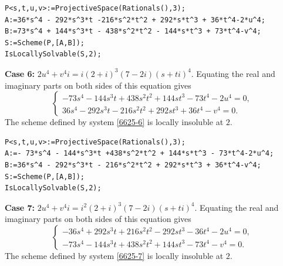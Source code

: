 \documentclass[a4paper,12pt,english,reqno]{amsart}
\begin{document}
\begin{lstlisting}
P<s,t,u,v>:=ProjectiveSpace(Rationals(),3);
A:=36*s^4 - 292*s^3*t -216*s^2*t^2 + 292*s*t^3 + 36*t^4-2*u^4;
B:=73*s^4 + 144*s^3*t - 438*s^2*t^2 - 144*s*t^3 + 73*t^4-v^4;
S:=Scheme(P,[A,B]);
IsLocallySolvable(S,2);
\end{lstlisting}

{\bf Case 6:} $2u^4+v^4i=i(2+i)^3(7-2i)(s+ti)^4$. Equating the real and imaginary parts on both sides of this equation gives
\begin{equation}\label{6625-6}
\begin{cases}
-73s^4 - 144s^3t + 438s^2t^2 + 144st^3 - 73t^4 - 2u^4=0,\\
36s^4 - 292s^3t - 216s^2t^2 + 292st^3 + 36t^4 - v^4=0.
\end{cases}
\end{equation}
The scheme defined by system \eqref{6625-6} is locally insoluble at $2$.


\begin{lstlisting}
P<s,t,u,v>:=ProjectiveSpace(Rationals(),3);
A:=- 73*s^4 - 144*s^3*t +438*s^2*t^2 + 144*s*t^3 - 73*t^4-2*u^4;
B:=36*s^4 - 292*s^3*t - 216*s^2*t^2 + 292*s*t^3 + 36*t^4-v^4;
S:=Scheme(P,[A,B]);
IsLocallySolvable(S,2);
\end{lstlisting}
{\bf Case 7:} $2u^4+v^4i=i^2(2+i)^3(7-2i)(s+ti)^4$. Equating the real and imaginary parts on both sides of this equation gives
\begin{equation}\label{6625-7}
\begin{cases}
-36s^4 + 292s^3t + 216s^2t^2 - 292st^3 - 36t^4 - 2u^4=0,\\
-73s^4 - 144s^3t + 438s^2t^2 + 144st^3 - 73t^4 - v^4=0.
\end{cases}
\end{equation}
The scheme defined by system \eqref{6625-7} is locally insoluble at $2$.
\end{document}
